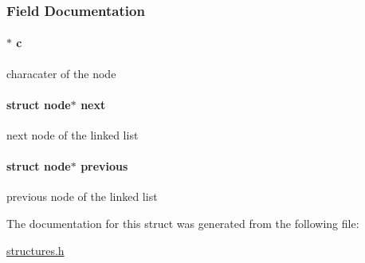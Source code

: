 \subsubsection{Field Documentation}
\hypertarget{structnode_af76e20a507ad8fd205b860bab7ba4416}{
\paragraph[{c}]{$\ast$ c}}\label{structnode_af76e20a507ad8fd205b860bab7ba4416}
characater of the node \hypertarget{structnode_a0dc1b6470487aa86d9936e3cab8b95be}{
\paragraph[{next}]{\setlength{\rightskip}{0pt plus 5cm}struct {\bf node}$\ast$ next}}\label{structnode_a0dc1b6470487aa86d9936e3cab8b95be}
next node of the linked list \hypertarget{structnode_aba783da56f092df6846bd3b7b9555728}{
\paragraph[{previous}]{\setlength{\rightskip}{0pt plus 5cm}struct {\bf node}$\ast$ previous}}\label{structnode_aba783da56f092df6846bd3b7b9555728}
previous node of the linked list 

The documentation for this struct was generated from the following file\-:\begin{DoxyCompactItemize}
\item 
\hyperlink{structures_8h}{structures.\-h}\end{DoxyCompactItemize}
